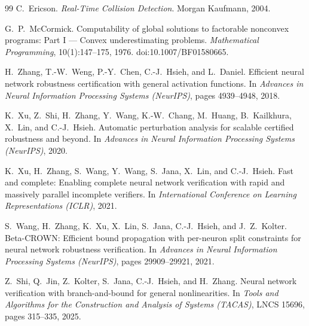 \documentclass[11pt]{article}
\theoremstyle{definition}
\theoremstyle{remark}
\begin{document}
\begin{thebibliography}{99}
C.~Ericson.
\newblock \emph{Real-Time Collision Detection}.
\newblock Morgan Kaufmann, 2004.

G.~P.~McCormick.
\newblock Computability of global solutions to factorable nonconvex programs: Part {I} --- Convex underestimating problems.
\newblock \emph{Mathematical Programming}, 10(1):147--175, 1976. doi:10.1007/BF01580665.

H.~Zhang, T.-W.~Weng, P.-Y.~Chen, C.-J.~Hsieh, and L.~Daniel.
\newblock Efficient neural network robustness certification with general activation functions.
\newblock In \emph{Advances in Neural Information Processing Systems (NeurIPS)}, pages 4939--4948, 2018.

K.~Xu, Z.~Shi, H.~Zhang, Y.~Wang, K.-W.~Chang, M.~Huang, B.~Kailkhura, X.~Lin, and C.-J.~Hsieh.
\newblock Automatic perturbation analysis for scalable certified robustness and beyond.
\newblock In \emph{Advances in Neural Information Processing Systems (NeurIPS)}, 2020.

K.~Xu, H.~Zhang, S.~Wang, Y.~Wang, S.~Jana, X.~Lin, and C.-J.~Hsieh.
\newblock Fast and complete: Enabling complete neural network verification with rapid and massively parallel incomplete verifiers.
\newblock In \emph{International Conference on Learning Representations (ICLR)}, 2021.

S.~Wang, H.~Zhang, K.~Xu, X.~Lin, S.~Jana, C.-J.~Hsieh, and J.~Z.~Kolter.
\newblock Beta-{CROWN}: Efficient bound propagation with per-neuron split constraints for neural network robustness verification.
\newblock In \emph{Advances in Neural Information Processing Systems (NeurIPS)}, pages 29909--29921, 2021.

Z.~Shi, Q.~Jin, Z.~Kolter, S.~Jana, C.-J.~Hsieh, and H.~Zhang.
\newblock Neural network verification with branch-and-bound for general nonlinearities.
\newblock In \emph{Tools and Algorithms for the Construction and Analysis of Systems (TACAS)}, LNCS 15696, pages 315--335, 2025.

\end{thebibliography}
\end{document}
